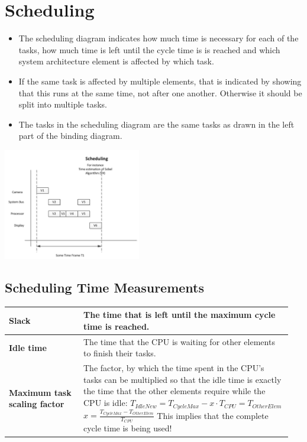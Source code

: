\section{Scheduling }
	\begin{itemize}
	  \item The scheduling diagram indicates how much time is necessary for each of the tasks, how much time is left until the cycle time is is reached and which system architecture element is affected by which task.
	  \item If the same task is affected by multiple elements, that is indicated by showing that this runs at the same time, not after one another. Otherwise it should be split into multiple tasks.
	  \item The tasks in the scheduling diagram are the same tasks as drawn in the left part of the binding diagram.
	\end{itemize}
	
	\includegraphics[width=0.45\textwidth]{./pictures/scheduling.png}
	
	\subsection{Scheduling Time Measurements}
	\begin{table}[H]\centering
		\begin{tabular}{|>{\bfseries}p{0.25\linewidth}|p{0.7\linewidth}|}
			\hline
				Slack
					& The time that is left until the maximum cycle time is reached.\\
			\hline
				Idle time
					& The time that the CPU is waiting for other elements to finish their tasks.\\
			\hline
				Maximum task scaling factor
					& The factor, by which the time spent in the CPU's tasks can be multiplied so that the idle time is exactly the time that the other elements require while the CPU is idle: \newline 
					{\Large $T_{IdleNew} = T_{CycleMax} - x \cdot T_{CPU} = T_{OtherElem}$} \newline 
					{\Large $x = \frac{T_{CycleMax} - T_{OtherElem}}{T_{CPU}}$} \newline
					This implies that the complete cycle time is being used!\\
			\hline
		\end{tabular}
	\end{table}
	
